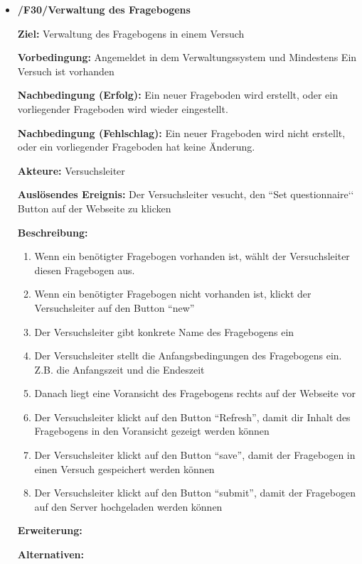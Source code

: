 \documentclass[a4paper]{scrreprt}
\begin{document}
\begin{itemize}
                \item \textbf{/F30/Verwaltung des Fragebogens}

                \par \textbf{Ziel: }Verwaltung des Fragebogens in einem Versuch
                \par \textbf{Vorbedingung: }Angemeldet in dem Verwaltungssystem und Mindestens Ein Versuch ist vorhanden 
                \par \textbf{Nachbedingung (Erfolg): }Ein neuer Frageboden wird erstellt, oder ein vorliegender Frageboden wird wieder eingestellt.
                \par \textbf{Nachbedingung (Fehlschlag): }Ein neuer Frageboden wird nicht erstellt, oder ein vorliegender Frageboden hat keine Änderung.
                \par \textbf{Akteure: }Versuchsleiter
                \par \textbf{Auslösendes Ereignis: }Der Versuchsleiter vesucht, den ``Set questionnaire‘‘ Button auf der
Webseite zu klicken

                \par \textbf{Beschreibung: }
                \begin{enumerate}
                    \item Wenn ein benötigter Fragebogen vorhanden ist, wählt der Versuchsleiter diesen Fragebogen aus.
                    \item Wenn ein benötigter Fragebogen nicht vorhanden ist, klickt der Versuchsleiter auf den Button ``new''
                    \item Der Versuchsleiter gibt konkrete Name des Fragebogens ein
                    \item Der Versuchsleiter stellt die Anfangsbedingungen des Fragebogens ein. Z.B. die Anfangszeit und die Endeszeit
                    \item Danach liegt eine Voransicht des Fragebogens rechts auf der Webseite vor
                    \item  Der Versuchsleiter klickt auf den Button ``Refresh'', damit dir Inhalt des Fragebogens in den Voransicht gezeigt werden können
                    \item Der Versuchsleiter klickt auf den Button ``save'', damit der Fragebogen in einen Versuch gespeichert werden können
                    \item Der Versuchsleiter klickt auf den Button ``submit'', damit der Fragebogen auf den Server hochgeladen werden können
                \end{enumerate}
                \par \textbf{Erweiterung: }
                \par \textbf{Alternativen: }



\end{itemize}
\end{document}
